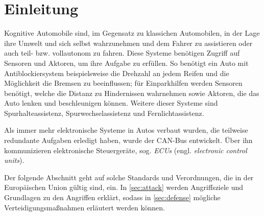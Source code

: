 
\section{Einleitung}
Kognitive Automobile sind, im Gegensatz zu klassichen Automobilen, in der Lage
ihre Umwelt und sich selbst wahrzunehmen und dem Fahrer zu assistieren oder
auch teil- bzw. vollautonom zu fahren. Diese Systeme benötigen Zugriff auf
Sensoren und Aktoren, um ihre Aufgabe zu erfüllen. So benötigt ein Auto mit
Antiblockiersystem beispielsweise die Drehzahl an jedem Reifen und die
Möglichkeit die Bremsen zu beeinflussen; für Einparkhilfen werden Sensoren
benötigt, welche die Distanz zu Hindernissen wahrnehmen sowie Aktoren, die das
Auto lenken und beschleunigen können. Weitere dieser Systeme sind
Spurhalteassistenz, Spurwechselassistenz und Fernlichtassistenz.

Als immer mehr elektronische Systeme in Autos verbaut wurden, die teilweise
redundante Aufgaben erledigt haben, wurde der CAN-Bus
entwickelt\cite{Kiencke1986}. Über ihn kommunizieren elektronische
Steuergeräte, sog. \textit{ECUs} (engl. \textit{electronic control units}).

Der folgende Abschnitt geht auf solche Standards und Verordnungen, die in der
Europäischen Union gültig sind, ein. In \cref{sec:attack} werden Angriffsziele
und Grundlagen zu den Angriffen erklärt, sodass in \cref{sec:defense} mögliche
Verteidigungsmaßnahmen erläutert werden können.